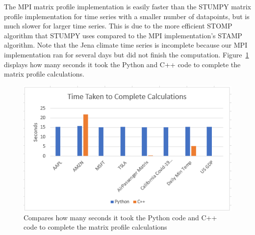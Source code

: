\documentclass[conference]{IEEEtran}
\begin{document}

The MPI matrix profile implementation is easily faster than the STUMPY matrix profile implementation for time series with a smaller number of datapoints, but is much slower for larger time series.  This is due to the more efficient STOMP algorithm that STUMPY uses compared to the MPI implementation's STAMP algorithm.  Note that the Jena climate time series is incomplete because our MPI implementation ran for several days but did not finish the computation.  Figure~\ref{fig:Time_Graph} displays how many seconds it took the Python and C++ code to complete the matrix profile calculations.

\begin{figure}
\begin{center}
\includegraphics[scale=1.05]{Time.png}
\caption{Compares how many seconds it took the Python code and C++ code to complete the matrix profile calculations}
\label{fig:Time_Graph}
\end{center}
\end{figure}
\end{document}
